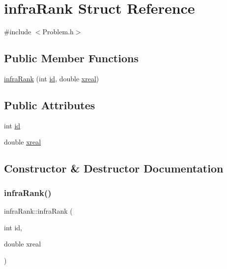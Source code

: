 \hypertarget{structinfraRank}{}\section{infra\+Rank Struct Reference}
\label{structinfraRank}


{\ttfamily \#include $<$Problem.\+h$>$}

\subsection*{Public Member Functions}
\begin{DoxyCompactItemize}
\item 
\mbox{\hyperlink{structinfraRank_aa50dcfdcee689bd1484c9ac2b09bc694}{infra\+Rank}} (int \mbox{\hyperlink{structinfraRank_ace3640f7fdc691b68111cf07e0eabaae}{id}}, double \mbox{\hyperlink{structinfraRank_a1bb966369809456d65bd4e2d4e19d775}{xreal}})
\end{DoxyCompactItemize}
\subsection*{Public Attributes}
\begin{DoxyCompactItemize}
\item 
int \mbox{\hyperlink{structinfraRank_ace3640f7fdc691b68111cf07e0eabaae}{id}}
\item 
double \mbox{\hyperlink{structinfraRank_a1bb966369809456d65bd4e2d4e19d775}{xreal}}
\end{DoxyCompactItemize}


\subsection{Constructor \& Destructor Documentation}
\mbox{\label{structinfraRank_aa50dcfdcee689bd1484c9ac2b09bc694}} 
\subsubsection{\texorpdfstring{infra\+Rank()}{infraRank()}}
{\footnotesize\ttfamily infra\+Rank\+::infra\+Rank (\begin{DoxyParamCaption}\item[{int}]{id,  }\item[{double}]{xreal }\end{DoxyParamCaption})\hspace{0.3cm}{\ttfamily [inline]}}



